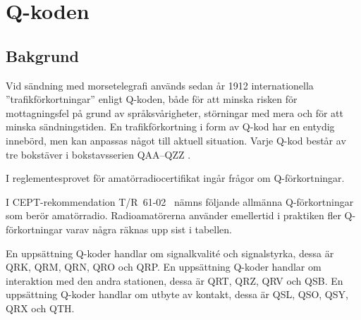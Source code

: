 \section{Q-koden}
\label{q-koden}

\subsection{Bakgrund}

Vid sändning med morsetelegrafi används sedan år 1912 internationella
''trafikförkortningar'' enligt Q-koden, både för att minska risken för
mottagningsfel på grund av språksvårigheter, störningar med mera och för
att minska sändningstiden.
En trafikförkortning i form av Q-kod har en entydig innebörd, men kan anpassas
något till aktuell situation.
Varje Q-kod består av tre bokstäver i bokstavsserien QAA--QZZ
\cite[M.1172]{ITU-RR}.

I reglementesprovet för amatörradiocertifikat ingår frågor om Q-förkortningar.

I CEPT-rekommendation T/R~61-02~\cite[Annex 6]{TR6102} nämns följande allmänna
Q-förkortningar som berör amatörradio.
Radioamatörerna använder emellertid i praktiken fler Q-förkortningar varav
några räknas upp sist i tabellen.

En uppsättning Q-koder handlar om signalkvalité och signalstyrka, dessa är
QRK, QRM, QRN, QRO och QRP.
En uppsättning Q-koder handlar om interaktion med den andra stationen,
dessa är QRT, QRZ, QRV och QSB.
En uppsättning Q-koder handlar om utbyte av kontakt, dessa är QSL, QSO,
QSY, QRX och QTH.

